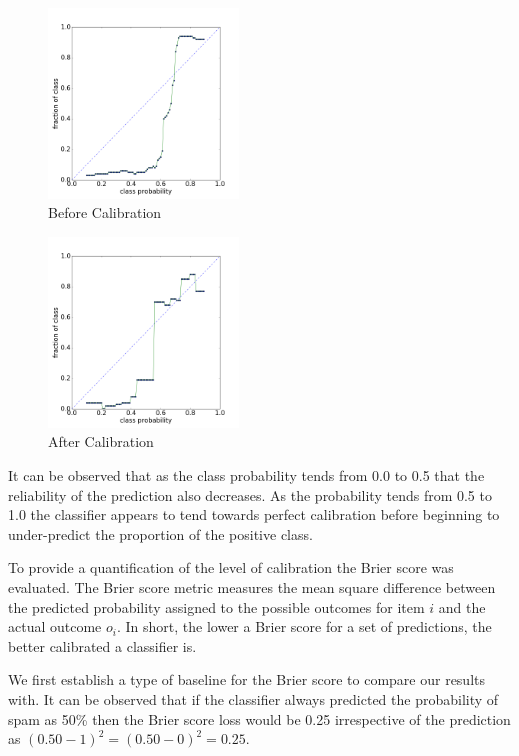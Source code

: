 \documentclass[12pt, a4paper]{article}
\begin{document}
	\begin{multicols}{2}
		\begin{figure}[H]
	    \caption{Before Calibration}
	    \label{beforecal}
	    \includegraphics[width=0.45\textwidth]{report_images/before_calibration}
	  \end{figure}
		\columnbreak
		\begin{figure}[H]
			\caption{After Calibration}
			\label{aftercal}
			\includegraphics[width=0.45\textwidth]{report_images/after_calibration}
		\end{figure}
	\end{multicols}

	It can be observed that as the class probability tends from 0.0 to 0.5 that the reliability of the prediction also decreases. As the probability tends from 0.5 to 1.0 the classifier appears to tend towards perfect calibration
	before beginning to under-predict the proportion of the positive class.

	To provide a quantification of the level of calibration the Brier score was evaluated. The Brier score metric measures the mean square difference between the predicted probability assigned to the possible outcomes for item $i$ and the actual outcome $o_i$. In short, the lower a Brier score for a set of predictions, the better calibrated a classifier is.

	We first establish a type of baseline for the Brier score to compare our results with. It can be observed that if the classifier always predicted the probability of spam as 50\% then the Brier score loss would be 0.25 irrespective of the prediction as $(0.50 - 1)^2 = (0.50 - 0)^2 = 0.25$.
\end{document}

